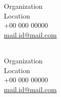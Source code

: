 \\

\begin{multicols}{2}

 \\
Organization \\
Location \\
\faMobile\acvHeaderIconSep +00 000 00000 \\
\href{mailto:mail.id@mail.com}{\faEnvelope\acvHeaderIconSep mail.id@mail.com}

 \\
Organization \\
Location \\
\faMobile\acvHeaderIconSep +00 000 00000 \\
\href{mailto:mail.id@mail.com}{\faEnvelope\acvHeaderIconSep mail.id@mail.com}


\end{multicols}
